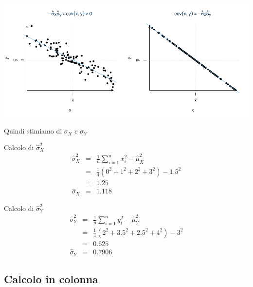 \documentclass[
  11pt,
]{book}
\theoremstyle{mytheoremstyle}
\theoremstyle{mydefstyle}
\begin{document}
\begin{center}\includegraphics{Appunti_di_Statistica_2025_files/figure-latex/17-regressione-I-37-1} \end{center}

Quindi stimiamo di \(\sigma_X\) e \(\sigma_Y\)

Calcolo di \(\hat\sigma_X^2\)
\begin{eqnarray*}
\hat\sigma_X^2&=&\frac 1 n\sum_{i=1}^n x_i^2-\hat\mu_X^2\\
&=&\frac 1 {4}(0^2+1^2+2^2+3^2)-1.5^2\\
&=&1.25\\
\hat\sigma_X &=& 1.118
\end{eqnarray*}

Calcolo di \(\hat\sigma_Y^2\)
\begin{eqnarray*}
\hat\sigma_Y^2&=&\frac 1 n\sum_{i=1}^n y_i^2-\hat\mu_Y^2\\
&=&\frac 1 {4}(2^2+3.5^2+2.5^2+4^2)-3^2\\
&=&0.625\\
\hat\sigma_Y &=& 0.7906
\end{eqnarray*}

\subsection{Calcolo in colonna}\label{calcolo-in-colonna}
\end{document}

